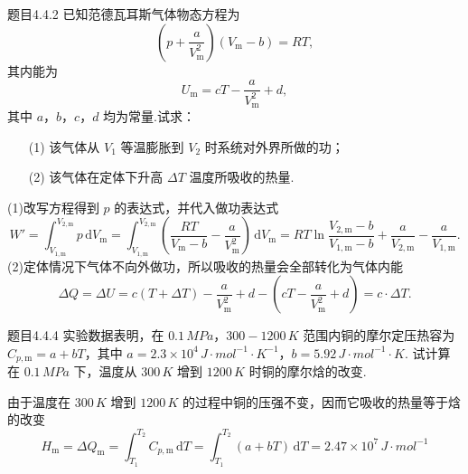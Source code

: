 \begin{question}{题目4.4.2}
    已知范德瓦耳斯气体物态方程为
    $$
        \left(p+\frac{a}{V_\mathrm{m}^2}\right)\left(V_\mathrm{m}-b\right) = RT,
    $$
    其内能为
    $$
        U_\mathrm{m} = cT - \frac{a}{V_\mathrm{m}^2} + d,
    $$
    其中 $a$，$b$，$c$，$d$ 均为常量.试求：
    \begin{enumerate}
        \item[(1)] 该气体从 $V_1$ 等温膨胀到 $V_2$ 时系统对外界所做的功；
        \item[(2)] 该气体在定体下升高 $\Delta T$ 温度所吸收的热量.
    \end{enumerate}
\end{question}
\begin{solution}
    (1)改写方程得到 $p$ 的表达式，并代入做功表达式
    $$
        W'  = \int_{V_\mathrm{1,m}}^{V_\mathrm{2,m}} p \,\mathrm{d}V_\mathrm{m}
        = \int_{V_\mathrm{1,m}}^{V_\mathrm{2,m}} \left(\frac{RT}{V_\mathrm{m}-b} - \frac{a}{V_\mathrm{m}^2} \right) \,\mathrm{d}V_\mathrm{m}
        = RT\ln\frac{V_\mathrm{2,m} - b}{V_\mathrm{1,m}-b} + \frac{a}{V_\mathrm{2,m}} - \frac{a}{V_\mathrm{1,m}}.
    $$
    (2)定体情况下气体不向外做功，所以吸收的热量会全部转化为气体内能
    $$
        \Delta{Q} = \Delta{U} = c( T + \Delta T ) - \frac{a}{V_\mathrm{m}^2} + d -\left(cT - \frac{a}{V_\mathrm{m}^2} + d\right) = c \cdot \Delta{T}.
    $$
\end{solution}

\begin{question}{题目4.4.4}
    实验数据表明，在 $0.1 \,\si{MPa}$，$300-1200 \,\si{K}$ 范围内铜的摩尔定压热容为 $C_{p,\mathrm{m}} = a + bT$，其中 $a = 2.3 \times 10^{4} \,\si{J \cdot mol^{-1} \cdot K^{-1}}$，$b = 5.92 \,\si{J \cdot mol^{-1} \cdot K}$. 试计算在 $0.1 \,\si{MPa}$ 下，温度从 $300\,\si{K}$ 增到 $1200\,\si{K}$ 时铜的摩尔焓的改变.
\end{question}
\begin{solution}
    由于温度在 $300 \,\si{K}$ 增到 $1200\,\si{K}$ 的过程中铜的压强不变，因而它吸收的热量等于焓的改变
    $$
        H_\mathrm{m} = \Delta{Q}_\mathrm{m} = \int_{T_1}^{T_2} C_{p,\mathrm{m}} \,\mathrm{d}T = \int_{T_1}^{T_2} (a+bT) \,\mathrm{d}T = 2.47 \times 10^7 \,\si{ J \cdot mol^{-1} }
    $$
\end{solution}


